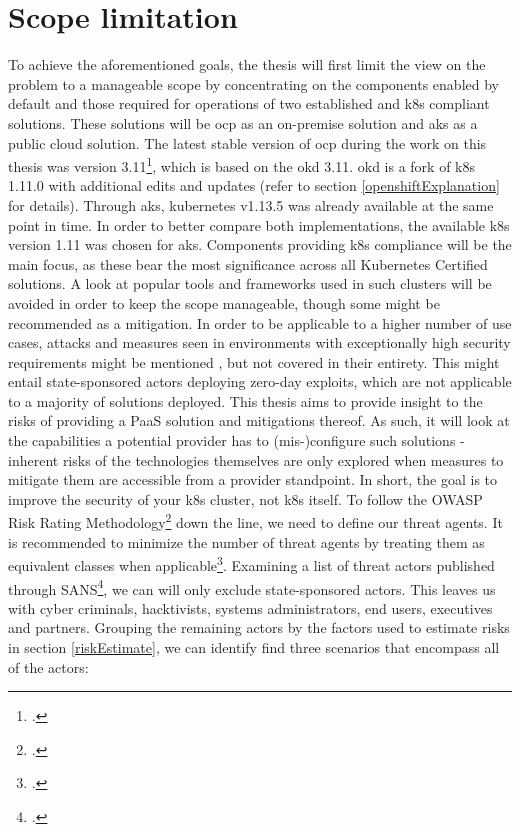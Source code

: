 \section{Scope limitation}

To achieve the aforementioned goals, the thesis will first limit the view on the problem to a manageable scope by
concentrating on the components enabled by default and those required for operations of two established and \gls{k8s} compliant solutions.
These solutions will be \gls{ocp} as an on-premise solution and \gls{aks} as a public cloud solution. 
The latest stable version of \gls{ocp} during the work on this thesis was version 3.11\footcite{ocpRelease}, which is based on the \gls{okd} 3.11. \gls{okd} is a fork of \gls{k8s} 1.11.0 with additional edits and updates (refer to section \ref{openshiftExplanation} for details).
Through \gls{aks}, kubernetes v1.13.5 was already available at the same point in time. In order to better compare both implementations, the available \gls{k8s} version 1.11 was chosen for \gls{aks}.
Components providing \gls{k8s} compliance will be the main focus, as these bear the most significance across all Kubernetes Certified solutions. 
A look at popular tools and frameworks used in such clusters will be avoided in order to keep the scope manageable, though some might be recommended as a mitigation.
In order to be applicable to a higher number of use cases, attacks and measures seen in environments with exceptionally high security requirements might be mentioned , but not  covered in their entirety. This might entail state-sponsored actors deploying zero-day exploits, which are not applicable to a majority of solutions deployed.
This thesis aims to provide insight to the risks of providing a PaaS solution and mitigations thereof. 
As such, it will look at the capabilities a potential provider has to (mis-)configure such solutions - inherent risks of the technologies themselves are only explored when measures to mitigate them are accessible from a provider standpoint. 
In short, the goal is to improve the security of your \gls{k8s} cluster, not \gls{k8s} itself.
To follow the OWASP Risk Rating Methodology\footcite{riskRating} down the line, we need to define our threat agents. It is recommended to minimize the number of threat agents by treating them as equivalent classes when applicable\footcite{threatModeling}. Examining a list of threat actors published through SANS\footcite{sansThreatActors}, we can will only exclude state-sponsored actors. This leaves us with cyber criminals, hacktivists, systems administrators, end users, executives and partners.
Grouping the remaining actors by the factors used to estimate risks in section \ref{riskEstimate}, we can identify find three scenarios that encompass all of the actors:

